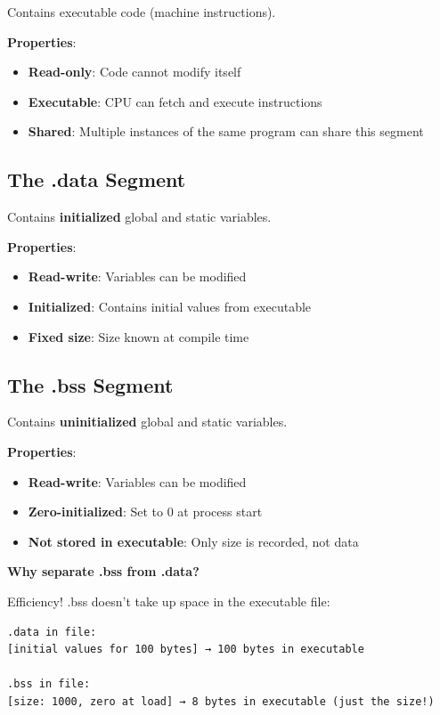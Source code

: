 Contains executable code (machine instructions).

\textbf{Properties}:
\begin{itemize}
    \item \textbf{Read-only}: Code cannot modify itself
    \item \textbf{Executable}: CPU can fetch and execute instructions
    \item \textbf{Shared}: Multiple instances of the same program can share this segment
\end{itemize}

\subsection{The .data Segment}

Contains \textbf{initialized} global and static variables.

\textbf{Properties}:
\begin{itemize}
    \item \textbf{Read-write}: Variables can be modified
    \item \textbf{Initialized}: Contains initial values from executable
    \item \textbf{Fixed size}: Size known at compile time
\end{itemize}

\subsection{The .bss Segment}

Contains \textbf{uninitialized} global and static variables.

\textbf{Properties}:
\begin{itemize}
    \item \textbf{Read-write}: Variables can be modified
    \item \textbf{Zero-initialized}: Set to 0 at process start
    \item \textbf{Not stored in executable}: Only size is recorded, not data
\end{itemize}

\textbf{Why separate .bss from .data?}

Efficiency! .bss doesn't take up space in the executable file:

\begin{verbatim}
.data in file:
[initial values for 100 bytes] → 100 bytes in executable

.bss in file:
[size: 1000, zero at load] → 8 bytes in executable (just the size!)
\end{verbatim}

